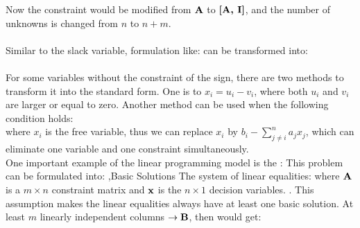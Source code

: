 \documentclass[10pt]{report}
\begin{document}
Now the constraint would be modified from $\textbf{A}$ to $\textbf{[A, I]}$, and the number of unknowns is changed from $n$ to $n+m$.\\
\\
Similar to the slack variable, formulation like:
can be transformed into:
\\
\\
For some variables without the constraint of the sign, there are two methods to transform it into the standard form. One is
to $x_i=u_i-v_i$, where both $u_i$ and $v_i$ are larger or equal to zero. Another method can be used when the following condition holds:\\
where $x_i$ is the free variable, thus we can replace $x_i$ by $b_i-\sum_{j\ne i}^n a_jx_j$, which can eliminate one variable and one constraint simultaneously.\\
One important example of the linear programming model is the :
This problem can be formulated into:
\sep{Basic Solutions}
The system of linear equalities:
where $\textbf{A}$ is a $m\times n$ constraint matrix and $\textbf{x}$ is the $n \times 1$ decision variables.
.
This assumption makes the linear equalities always have at least one basic solution.
At least $m$ linearly independent columns $\to \textbf{B}$, then would get:
\end{document}
